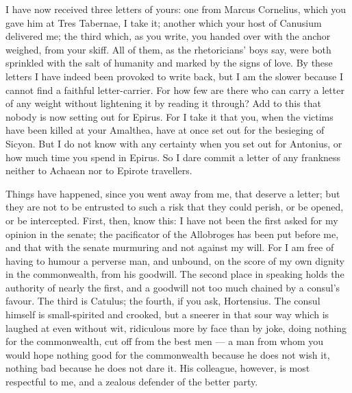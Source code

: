 

 I have now received three letters of yours: one from Marcus Cornelius, which you gave him at Tres Tabernae, I take it; another which your host of Canusium delivered me; the third which, as you write, you handed over with the anchor weighed, from your skiff. All of them, as the rhetoricians' boys say, were both sprinkled with the salt of humanity and marked by the signs of love. By these letters I have indeed been provoked to write back, but I am the slower because I cannot find a faithful letter-carrier. For how few are there who can carry a letter of any weight without lightening it by reading it through? Add to this that nobody is now setting out for Epirus. For I take it that you, when the victims have been killed at your Amalthea, have at once set out for the besieging of Sicyon. But I do not know with any certainty when you set out for Antonius, or how much time you spend in Epirus. So I dare commit a letter of any frankness neither to Achaean nor to Epirote travellers.

 Things have happened, since you went away from me, that deserve a letter; but they are not to be entrusted to such a risk that they could perish, or be opened, or be intercepted. First, then, know this: I have not been the first asked for my opinion in the senate; the pacificator of the Allobroges has been put before me, and that with the senate murmuring and not against my will. For I am free of having to humour a perverse man, and unbound, on the score of my own dignity in the commonwealth, from his goodwill. The second place in speaking holds the authority of nearly the first, and a goodwill not too much chained by a consul's favour. The third is Catulus; the fourth, if you ask, Hortensius. The consul himself is small-spirited and crooked, but a sneerer in that sour way which is laughed at even without wit, ridiculous more by face than by joke, doing nothing for the commonwealth, cut off from the best men --- a man from whom you would hope nothing good for the commonwealth because he does not wish it, nothing bad because he does not dare it. His colleague, however, is most respectful to me, and a zealous defender of the better party.

